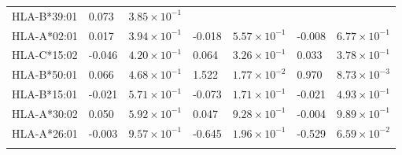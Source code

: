 \documentclass[]{article}
\begin{document}
\begin{longtable}[H]{lp{1cm}p{2cm}p{1cm}p{2cm}p{1cm}p{2cm}}
		HLA-B*39:01 & 0.073 & $3.85 \times 10^{-1}$ &  &  &  &  \\ 
		HLA-A*02:01 & 0.017 & $3.94 \times 10^{-1}$ & -0.018 & $5.57 \times 10^{-1}$ & -0.008 & $6.77 \times 10^{-1}$ \\ 
		HLA-C*15:02 & -0.046 & $4.20 \times 10^{-1}$ & 0.064 & $3.26 \times 10^{-1}$ & 0.033 & $3.78 \times 10^{-1}$ \\ 
		HLA-B*50:01 & 0.066 & $4.68 \times 10^{-1}$ & 1.522 & $1.77 \times 10^{-2}$ & 0.970 & $8.73 \times 10^{-3}$ \\ 
		HLA-B*15:01 & -0.021 & $5.71 \times 10^{-1}$ & -0.073 & $1.71 \times 10^{-1}$ & -0.021 & $4.93 \times 10^{-1}$ \\ 
		HLA-A*30:02 & 0.050 & $5.92 \times 10^{-1}$ & 0.047 & $9.28 \times 10^{-1}$ & -0.004 & $9.89 \times 10^{-1}$ \\ 
		HLA-A*26:01 & -0.003 & $9.57 \times 10^{-1}$ & -0.645 & $1.96 \times 10^{-1}$ & -0.529 & $6.59 \times 10^{-2}$ \\
		\hline
		\label{tab:full-mclaren-comparison}
\end{longtable}


\typeout{}
\printbibliography
\end{document}
